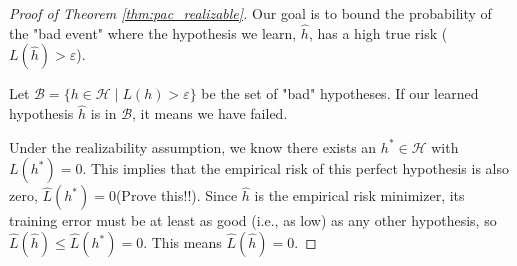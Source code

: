 \documentclass[11pt]{article}
\theoremstyle{plain} %
\begin{document}
\begin{proof}[Proof of Theorem \ref{thm:pac_realizable}]
Our goal is to bound the probability of the "bad event" where the hypothesis we learn, $\hat{h}$, has a high true risk ($L(\hat{h}) > \varepsilon$).

Let $\mathcal{B} = \{h \in \mathcal{H} \mid L(h) > \varepsilon\}$ be the set of "bad" hypotheses. If our learned hypothesis $\hat{h}$ is in $\mathcal{B}$, it means we have failed.

Under the realizability assumption, we know there exists an $h^* \in \mathcal{H}$ with $L(h^*)=0$. This implies that the empirical risk of this perfect hypothesis is also zero, $\widehat{L}(h^*)=0$(Prove this!!). Since $\hat{h}$ is the empirical risk minimizer, its training error must be at least as good (i.e., as low) as any other hypothesis, so $\widehat{L}(\hat{h}) \leq \widehat{L}(h^*) = 0$. This means $\widehat{L}(\hat{h}) = 0$.


\end{proof}
\end{document}
